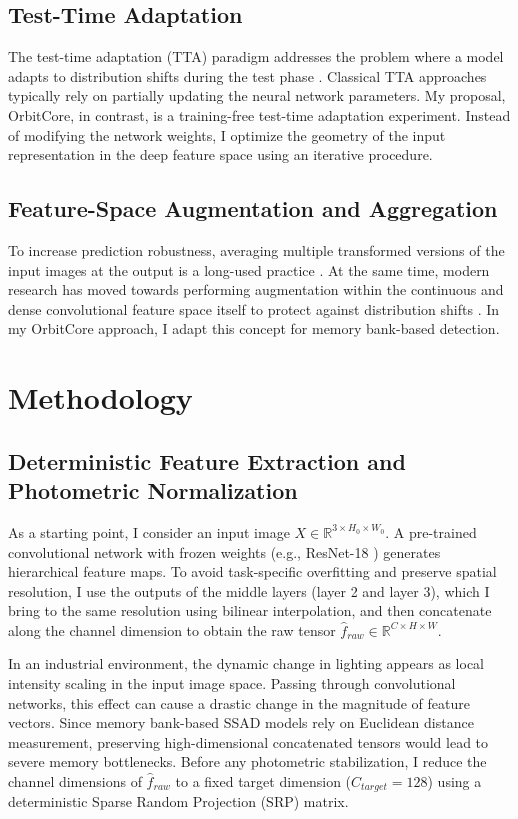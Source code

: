 \documentclass{article}
\begin{document}
	\subsection{Test-Time Adaptation}
	The test-time adaptation (TTA) paradigm addresses the problem where a model adapts to distribution shifts during the test phase \cite{Sun2020}. Classical TTA approaches typically rely on partially updating the neural network parameters. My proposal, OrbitCore, in contrast, is a training-free test-time adaptation experiment. Instead of modifying the network weights, I optimize the geometry of the input representation in the deep feature space using an iterative procedure.
	
	\subsection{Feature-Space Augmentation and Aggregation}
	To increase prediction robustness, averaging multiple transformed versions of the input images at the output is a long-used practice \cite{Krizhevsky2012}. At the same time, modern research has moved towards performing augmentation within the continuous and dense convolutional feature space itself to protect against distribution shifts \cite{Upadhyay2022}. In my OrbitCore approach, I adapt this concept for memory bank-based detection.
	
	\section{Methodology}
	\subsection{Deterministic Feature Extraction and Photometric Normalization}
	\label{subsec:feature_extraction}
	As a starting point, I consider an input image $X \in \mathbb{R}^{3 \times H_0 \times W_0}$. A pre-trained convolutional network with frozen weights (e.g., ResNet-18 \cite{He2016}) generates hierarchical feature maps. To avoid task-specific overfitting and preserve spatial resolution, I use the outputs of the middle layers (layer 2 and layer 3), which I bring to the same resolution using bilinear interpolation, and then concatenate along the channel dimension to obtain the raw tensor $\hat{f}_{raw} \in \mathbb{R}^{C \times H \times W}$.
	
	In an industrial environment, the dynamic change in lighting appears as local intensity scaling in the input image space. Passing through convolutional networks, this effect can cause a drastic change in the magnitude of feature vectors. Since memory bank-based SSAD models rely on Euclidean distance measurement, preserving high-dimensional concatenated tensors would lead to severe memory bottlenecks. Before any photometric stabilization, I reduce the channel dimensions of $\hat{f}_{raw}$ to a fixed target dimension ($C_{target} = 128$) using a deterministic Sparse Random Projection (SRP) matrix. 
	
\end{document}
